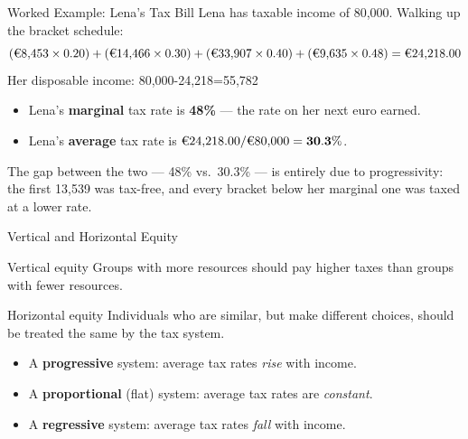 \documentclass[11pt,aspectratio=169]{beamer}
\begin{document}
\begin{frame}{Worked Example: Lena's Tax Bill}
	\footnotesize
	Lena has taxable income of \texteuro{}80,000. Walking up the bracket schedule:
	\[
	(\text{\texteuro}8{,}453 \times 0.20) + (\text{\texteuro}14{,}466 \times 0.30) + (\text{\texteuro}33{,}907 \times 0.40) + (\text{\texteuro}9{,}635 \times 0.48) = \text{\texteuro}24{,}218.00
	\]
	Her disposable income: 80,000-24,218=55,782
	\vspace{0.3em}
	\begin{itemize}
		\item Lena's \textbf{marginal} tax rate is \textbf{48\%} --- the rate on her next euro earned.
		\item Lena's \textbf{average} tax rate is \(\text{\texteuro}24{,}218.00 / \text{\texteuro}80{,}000 = \mathbf{30.3\%}\).
	\end{itemize}
	\vspace{0.3em}

	The gap between the two --- 48\% vs.\ 30.3\% --- is entirely due to progressivity: the first \texteuro{}13,539 was tax-free, and every bracket below her marginal one was taxed at a lower rate.
\end{frame}

\begin{frame}{Vertical and Horizontal Equity}
  \begin{block}{Vertical equity}
    Groups with more resources should pay higher taxes than groups with fewer resources.
  \end{block}
  \begin{block}{Horizontal equity}
    Individuals who are similar, but make different choices, should be treated the same by the tax system.
  \end{block}
  \vspace{0.3em}
  \begin{itemize}
    \item A \textbf{progressive} system: average tax rates \emph{rise} with income.
    \item A \textbf{proportional} (flat) system: average tax rates are \emph{constant}.
    \item A \textbf{regressive} system: average tax rates \emph{fall} with income.
  \end{itemize}
\end{frame}
\end{document}
